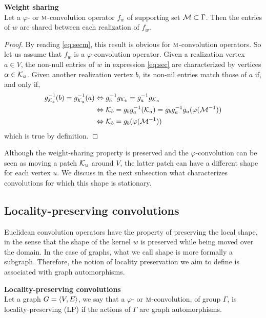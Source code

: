 \begin{proposition}\textbf{Weight sharing}\\
Let a $\varphi$- or $\operatorname{\textsc{m}}$-convolution operator $f_w$ of supporting set $\mathcal{M} \subset \Gamma$. Then the entries of $w$ are shared between each realization of $f_w$.
\label{prop:ws}
\end{proposition}
\begin{proof}
By reading \eqref{eq:secm}, this result is obvious for $\operatorname{\textsc{m}}$-convolution operators. So let us assume that $f_w$ is a $\varphi$-convolution operator. Given a realization vertex $a \in V$, the non-null entries of $w$ in expression \eqref{eq:sec} are characterized by vertices $\alpha \in \mathcal{K}_a$. Given another realization vertex $b$, its non-nil entries match those of $a$ if, and only if,
\begin{align*}
g_{\mathcal{K}_b}^{-1}(b) = g_{\mathcal{K}_a}^{-1}(a)
  & \Leftrightarrow  g_{b}^{-1}g_{\mathcal{K}_{b}} = g_a^{-1}g_{\mathcal{K}_a}\\
  & \Leftrightarrow  \mathcal{K}_{b} = g_{b}g_a^{-1}(\mathcal{K}_a) = g_{b}g_a^{-1}g_a(\varphi(\mathcal{M}^{-1}))\\
  & \Leftrightarrow  \mathcal{K}_{b} = g_{b}(\varphi(\mathcal{M}^{-1}))
\end{align*}
which is true by definition.
\end{proof}

Although the weight-sharing property is preserved and the $\varphi$-convolution can be seen as moving a patch $\mathcal{K}_u$ around $V$, the latter patch can have a different shape for each vertex $u$. We discuss in the next subsection what characterizes convolutions for which this shape is stationary.

\subsection{Locality-preserving convolutions}

Euclidean convolution operators have the property of preserving the local shape, in the sense that the shape of the kernel $w$ is preserved while being moved over the domain. In the case of graphs, what we call shape is more formally a subgraph. Therefore, the notion of locality preservation we aim to define is associated with graph automorphisms.

\begin{definition}\textbf{Locality-preserving convolutions}\\
Let a graph $G = \langle V, E \rangle$, we say that a $\varphi$- or $\operatorname{\textsc{m}}$-convolution, of group $\Gamma$, is locality-preserving (LP) if the actions of $\Gamma$ are graph automorphisms.
\end{definition}

